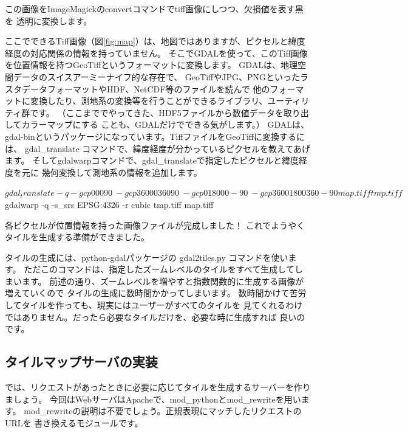 \documentclass[mingoth,a4paper]{jsarticle}
\begin{document}
この画像をImageMagickのconvertコマンドでtiff画像にしつつ、欠損値を表す黒を
透明に変換します。

ここでできるTiff画像（図\ref{fig:map}）は、地図ではありますが、ピクセルと緯度経度の対応関係の情報を持っていません。
そこでGDALを使って、このTiff画像を位置情報を持つGeoTiffというフォーマットに変換します。
GDALは、地理空間データのスイスアーミーナイフ的な存在で、
GeoTiffやJPG、PNGといったラスタデータフォーマットやHDF、NetCDF等のファイルを読んで
他のフォーマットに変換したり、測地系の変換等を行うことができるライブラリ、ユーティリティ群です。
（ここまででやってきた、HDF5ファイルから数値データを取り出してカラーマップにする
ことも、GDALだけでできる気がします。）
GDALは、gdal-binというパッケージになっています。TiffファイルをGeoTiffに変換するには、
gdal\_translate コマンドで、緯度経度が分かっているピクセルを教えてあげます。
そしてgdalwarpコマンドで、gdal\_translateで指定したピクセルと緯度経度を元に
幾何変換して測地系の情報を追加します。
%
\begin{commandline}
$ gdal_translate -q -gcp 0 0 0 90 \
                -gcp 3600 0 360 90 \
                -gcp 0 1800 0 -90 \
                -gcp 3600 1800 360 -90 map.tiff tmp.tiff

$ gdalwarp -q -s_srs EPSG:4326 -r cubic tmp.tiff map.tiff
\end{commandline}
%
各ピクセルが位置情報を持った画像ファイルが完成しました！
これでようやくタイルを生成する準備ができました。

タイルの生成には、python-gdalパッケージの gdal2tiles.py コマンドを使います。
ただこのコマンドは、指定したズームレベルのタイルをすべて生成してしまいます。
前述の通り、ズームレベルを増やすと指数関数的に生成する画像が増えていくので
タイルの生成に数時間かかってしまいます。
数時間かけて苦労してタイルを作っても、現実にはユーザーがすべてのタイルを
見てくれるわけではありません。だったら必要なタイルだけを、必要な時に生成すれば
良いのです。

\subsection{タイルマップサーバの実装}
では、リクエストがあったときに必要に応じてタイルを生成するサーバーを作りましょう。
今回はWebサーバはApacheで、mod\_pythonとmod\_rewriteを用います。
mod\_rewriteの説明は不要でしょう。正規表現にマッチしたリクエストのURLを
書き換えるモジュールです。
\end{document}
